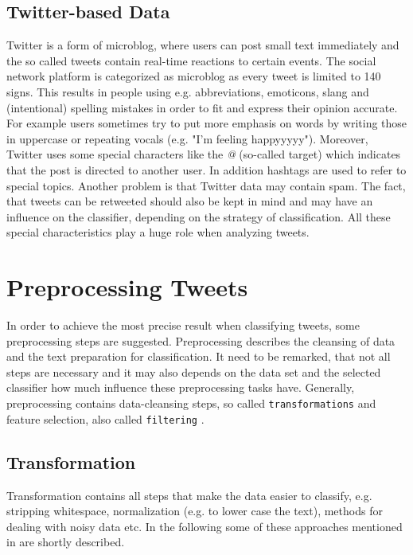 \documentclass{acm_proc_article-sp}
\begin{document}
\subsection{Twitter-based Data} \label{twitter-based} 
Twitter is a form of microblog, where users can
post small text immediately and the so called tweets contain real-time
reactions to certain events. The social network platform is categorized as
microblog as every tweet is limited to 140 signs. This results in people using
e.g. abbreviations, emoticons, slang and (intentional) spelling mistakes in order to fit
and express their opinion accurate. For example users sometimes try to put more emphasis on words by writing those in uppercase or repeating vocals (e.g. "I'm feeling happyyyyy"). Moreover, Twitter uses some special
characters like the \emph{@} (so-called target) which indicates that the post is directed to another
user. In addition hashtags are used to refer to special topics.  Another problem
is that Twitter data may contain spam. The fact, that tweets can be retweeted should also be kept in mind and may have an influence on the classifier, depending on the strategy of classification.
All these special characteristics play a
huge role when analyzing tweets. \cite{agarwal2011sentiment, read2005using}


\section{Preprocessing Tweets} \label{preprocessing} In order to achieve the
most precise result when classifying tweets, some preprocessing steps are
suggested. Preprocessing describes the cleansing of data and the text preparation for classification. It need to be remarked, that not all steps are necessary and it may also depends on the data set and the selected classifier how much influence these preprocessing tasks have. 
Generally, preprocessing contains data-cleansing steps, so called \texttt{transformations} and feature selection, also called \texttt{filtering} \cite{haddi2013therole}.


\subsection{Transformation}
Transformation contains all steps that make the data easier to classify, e.g. stripping whitespace, normalization (e.g. to lower case the text), methods for dealing with noisy data etc. 
In the following some of these approaches mentioned in \cite{ting2011naive, pak2010twitter, go2009twitter, agarwal2011sentiment, pang2008opinion, haddi2013therole} are shortly described.
\end{document}
